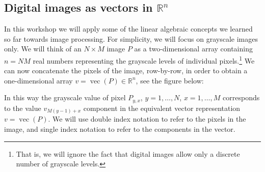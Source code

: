 \documentclass[10pt,a4paper]{article}
\newcommand{\R}{\mathbb{R}}
\theoremstyle{plain}
\theoremstyle{definition}
\DeclareMathOperator{\vc}{vec}
\begin{document}
\subsection*{Digital images as vectors in \(\R^n\)}
In this workshop we will apply some of the linear algebraic concepts we learned so far towards image processing.  For simplicity, we will focus on grayscale images only.
We will think of an \(N\times M\) image \(P\) as a two-dimensional array containing \(n = NM\) real numbers representing the grayscale levels of individual pixels.\footnote{That is, we will ignore the
fact that digital images allow only a discrete number of grayscale levels.}
We can now concatenate the pixels of the image, row-by-row, in order to obtain a one-dimensional array \(v=\vc(P) \in \R^n\), see the figure below:
In this way the grayscale value of pixel \(P_{y,x}\), \(y=1,\dots,N\), \(x=1,\dots,M\)
corresponds to the value \(v_{M(y-1) + x}\) component in the equivalent vector representation \(v=\vc(P)\).
We will use double index notation to refer to the pixels in the image, and single index
notation to refer to the components in the vector.
\end{document}
